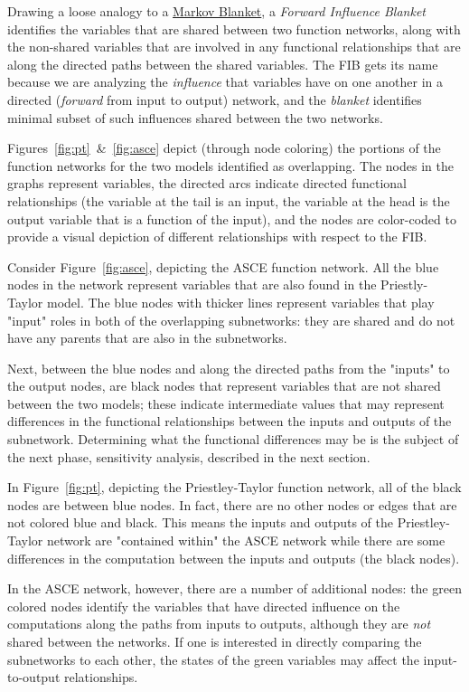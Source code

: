 \documentclass[article, 12pt, oneside]{memoir}
\begin{document}
Drawing a loose analogy to a
\href{https://en.wikipedia.org/wiki/Markov_blanket}{Markov Blanket}, a
\emph{Forward Influence Blanket} identifies the variables that are
shared between two function networks, along with the non-shared
variables that are involved in any functional relationships that are
along the directed paths between the shared variables. The FIB gets its
name because we are analyzing the \emph{influence} that variables have
on one another in a directed (\emph{forward} from input to output)
network, and the \emph{blanket} identifies minimal subset of such
influences shared between the two networks.

Figures~\ref{fig:pt}~\&~\ref{fig:asce} depict 
(through node coloring) the portions of the
function networks for the two models identified as overlapping. The
nodes in the graphs represent variables, the directed arcs indicate
directed functional relationships (the variable at the tail is an input,
the variable at the head is the output variable that is a function of
the input), and the nodes are color-coded to provide a visual depiction
of different relationships with respect to the FIB.

Consider Figure~\ref{fig:asce}, depicting the ASCE function network. All the
blue nodes in the network represent variables that are also found in the
Priestly-Taylor model. The blue nodes with thicker lines represent
variables that play "input" roles in both of the overlapping
subnetworks: they are shared and do not have any parents that are also
in the subnetworks.

Next, between the blue nodes and along the directed paths from the
"inputs" to the output nodes, are black nodes that represent variables
that are not shared between the two models; these indicate intermediate
values that may represent differences in the functional relationships
between the inputs and outputs of the subnetwork. Determining what the
functional differences may be is the subject of the next phase,
sensitivity analysis, described in the next section.

In Figure~\ref{fig:pt}, depicting the Priestley-Taylor function network,
all of the black nodes are between blue nodes. In fact, there are no
other nodes or edges that are not colored blue and black. This means the
inputs and outputs of the Priestley-Taylor network are "contained
within" the ASCE network while there are some differences in the
computation between the inputs and outputs (the black nodes).

In the ASCE network, however, there are a number of additional nodes:
the green colored nodes identify the variables that have directed
influence on the computations along the paths from inputs to outputs,
although they are \emph{not} shared between the networks. If one is
interested in directly comparing the subnetworks to each other, the
states of the green variables may affect the input-to-output
relationships.
\end{document}
